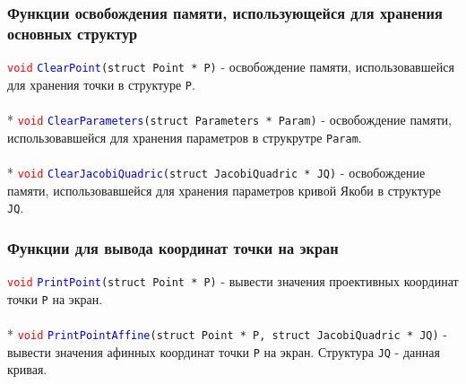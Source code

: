 \documentclass[12pt]{article}
\begin{document}
\subsubsection{Функции освобождения памяти, использующейся для хранения основных структур}
\textcolor{red}{\texttt{void}} \textcolor{blue}{\texttt{ClearPoint}}\texttt{(struct Point * P)} - освобождение памяти, использовавшейся для хранения точки в структуре \texttt{P}.\\
\\*
\textcolor{red}{\texttt{void}} \textcolor{blue}{\texttt{ClearParameters}}\texttt{(struct Parameters * Param)} - освобождение памяти, использовавшейся для хранения параметров в струкрутре \texttt{Param}.\\
\\*
\textcolor{red}{\texttt{void}} \textcolor{blue}{\texttt{ClearJacobiQuadric}}\texttt{(struct JacobiQuadric * JQ)} - освобождение памяти, использовавшейся для хранения параметров кривой Якоби в структуре \texttt{JQ}.\\

\subsubsection{Функции для вывода координат точки на экран}
\textcolor{red}{\texttt{void}} \textcolor{blue}{\texttt{PrintPoint}}\texttt{(struct Point * P)} - вывести значения проективных координат точки \texttt{P} на экран.\\
\\*
\textcolor{red}{\texttt{void}} \textcolor{blue}{\texttt{PrintPointAffine}}\texttt{(struct Point * P, struct JacobiQuadric * JQ)} - вывести значения афинных координат точки \texttt{P} на экран. Структура \texttt{JQ} - данная кривая.\\
\end{document}
